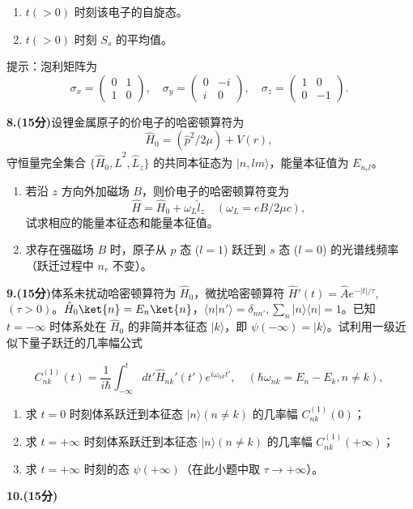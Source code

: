 \begin{enumerate}
    \item $t(>0)$ 时刻该电子的自旋态。
    \item $t(>0)$ 时刻 $S_s$ 的平均值。
\end{enumerate}

提示：泡利矩阵为
\[
\sigma_x = \begin{pmatrix}
0 & 1 \\
1 & 0
\end{pmatrix}, \quad
\sigma_y = \begin{pmatrix}
0 & -i \\
i & 0
\end{pmatrix}, \quad
\sigma_z = \begin{pmatrix}
1 & 0 \\
0 & -1
\end{pmatrix}.~
\]

\textbf{8.(15分)}设锂金属原子的价电子的哈密顿算符为 
\[
\hat{H}_0 = (\hat{p}^2/2\mu) + V(r),~
\]
守恒量完全集合 $\{\hat{H}_0, \hat{L}^2, \hat{L}_z\}$ 的共同本征态为 $\lvert n,l m \rangle$，能量本征值为 $E_{n_rl}$。

\begin{enumerate}
    \item 若沿 $z$ 方向外加磁场 $B$，则价电子的哈密顿算符变为 
    \[
    \hat{H} = \hat{H}_0 + \omega_L \hat{l}_z \quad (\omega_L = eB/2\mu c),~
    \]
    试求相应的能量本征态和能量本征值。
    
    \item 求存在强磁场 $B$ 时，原子从 $p$ 态 ($l = 1$) 跃迁到 $s$ 态 ($l = 0$) 的光谱线频率（跃迁过程中 $n_r$ 不变）。
\end{enumerate}

\textbf{9.(15分)}体系未扰动哈密顿算符为 $\hat{H}_0$，微扰哈密顿算符 $\hat{H}'(t) = \hat{A} e^{-|t|/\tau}$, $(\tau > 0)$。$\hat{H}_0\ket{n} = E_n \ket{n}$，$\langle n \lvert n' \rangle = \delta_{nn'},\sum_n |n\rangle \langle n| = 1$。已知 $t = -\infty$ 时体系处在 $\hat{H}_0$ 的非简并本征态 $\lvert k \rangle$，即 $\psi(-\infty) = \lvert k \rangle$。试利用一级近似下量子跃迁的几率幅公式

\[
C_{nk}^{(1)}(t) = \frac{1}{i\hbar} \int_{-\infty}^{t} dt' \hat{H}_{nk}'(t') e^{i\omega_{nk}t'}, \quad (\hbar \omega_{nk} = E_n - E_k, n \neq k),~
\]

\begin{enumerate}
    \item 求 $t = 0$ 时刻体系跃迁到本征态 $\lvert n \rangle (n \neq k)$ 的几率幅 $C_{nk}^{(1)}(0)$；
    \item 求 $t = +\infty$ 时刻体系跃迁到本征态 $\lvert n \rangle (n \neq k)$ 的几率幅 $C_{nk}^{(1)}(+\infty)$；
    \item 求 $t = +\infty$ 时刻的态 $\psi(+\infty)$（在此小题中取 $\tau \to +\infty$）。
\end{enumerate}


\textbf{10.(15分)}
